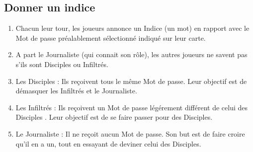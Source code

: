 \documentclass{article}%
\begin{document}
\subsection{ Donner un indice
}%
\label{subsec:Donnerunindice}%
\begin{enumerate}%
\item%
%
  Chacun leur tour, les joueurs annonce un Indice (un mot) en rapport avec le Mot de passe préalablement sélectionné indiqué sur leur carte.
%
\item%
%
  A part le Journaliste (qui connait son rôle), les autres joueurs ne savent pas s'ils sont Disciples ou Infiltrés.
%
\item%
%
 Les Disciples%
  : Ils reçoivent tous le même Mot de passe. Leur objectif est de démasquer les Infiltrés et le Journaliste.
%
\item%
%
 Les Infiltrés%
  : Ils reçoivent un Mot de passe légérement différent de celui des %
 Disciples%
 . Leur objectif est de se faire passer pour des Disciples.
%
\item%
%
 Le Journaliste%
  : Il ne reçoit aucun Mot de passe. Son but est de faire croire qu'il en a un, tout en essayant de deviner celui des Disciples.
%
\end{enumerate}

%
\end{document}
